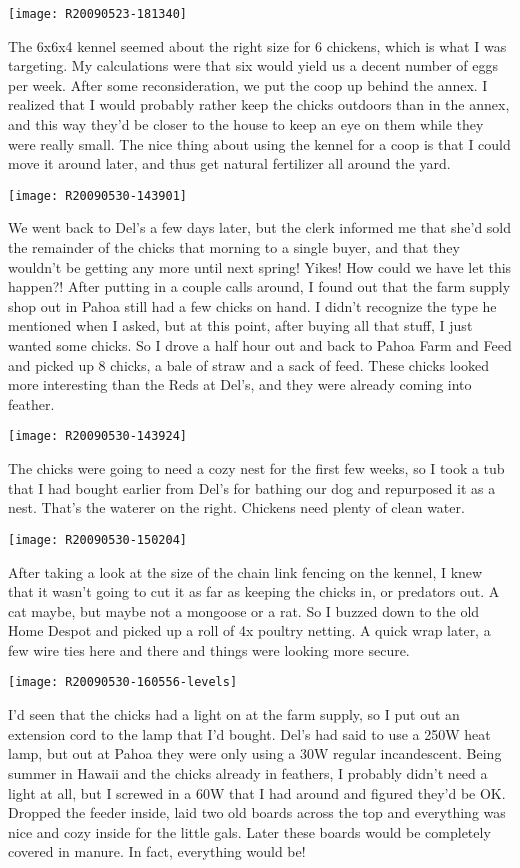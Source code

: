 \texttt{[image: R20090523-181340]}

The 6x6x4 kennel seemed about the right size for 6 chickens, which is
what I was targeting.  My calculations were that six would yield us a
decent number of eggs per week.  After some reconsideration, we put the
coop up behind the annex.  I realized that I would probably rather keep
the chicks outdoors than in the annex, and this way they'd be closer to
the house to keep an eye on them while they were really small.  The nice
thing about using the kennel for a coop is that I could move it around
later, and thus get natural fertilizer all around the yard. 
\newpage

\texttt{[image: R20090530-143901]}

We went back to Del's a few days later, but the clerk informed me that
she'd sold the remainder of the chicks that morning to a single buyer,
and that they wouldn't be getting any more until next spring! Yikes! How
could we have let this happen?! After putting in a couple calls around,
I found out that the farm supply shop out in Pahoa still had a few
chicks on hand. I didn't recognize the type he mentioned when I asked,
but at this point, after buying all that stuff, I just wanted some
chicks. So I drove a half hour out and back to Pahoa Farm and Feed and
picked up 8 chicks, a bale of straw and a sack of feed. These chicks
looked more interesting than the Reds at Del's, and they were already
coming into feather. 
\newpage

\texttt{[image: R20090530-143924]}

The chicks were going to need a cozy nest for the first few weeks, so I
took a tub that I had bought earlier from Del's for bathing our dog and
repurposed it as a nest.  That's the waterer on the right.  Chickens
need plenty of clean water. 
\newpage

\texttt{[image: R20090530-150204]}

After taking a look at the size of the chain link fencing on the kennel,
I knew that it wasn't going to cut it as far as keeping the chicks in,
or predators out.  A cat maybe, but maybe not a mongoose or a rat.  So I
buzzed down to the old Home Despot and picked up a roll of 4x poultry
netting.  A quick wrap later, a few wire ties here and there and things
were looking more secure. 
\newpage

\texttt{[image: R20090530-160556-levels]}

I'd seen that the chicks had a light on at the farm supply, so I put out
an extension cord to the lamp that I'd bought.  Del's had said to use a
250W heat lamp, but out at Pahoa they were only using a 30W regular
incandescent.  Being summer in Hawaii and the chicks already in
feathers, I probably didn't need a light at all, but I screwed in a 60W
that I had around and figured they'd be OK.  Dropped the feeder inside,
laid two old boards across the top and everything was nice and cozy
inside for the little gals.  Later these boards would be completely
covered in manure.  In fact, everything would be! 
\newpage

